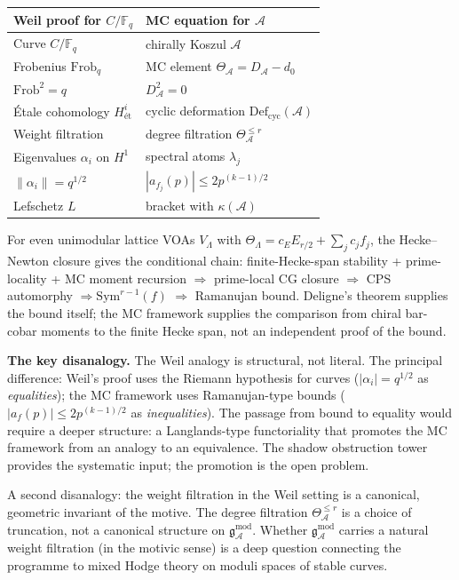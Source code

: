 \documentclass[11pt,reqno]{amsart}
\theoremstyle{definition}
\theoremstyle{remark}
\providecommand{\cA}{\mathcal{A}}
\providecommand{\Defcyc}{\mathrm{Def}_{\mathrm{cyc}}}
\providecommand{\Sym}{\mathrm{Sym}}
\providecommand{\gAmod}{\mathfrak{g}^{\mathrm{mod}}_\cA}
\providecommand{\Defcyc}{\mathrm{Def}_{\mathrm{cyc}}}
\providecommand{\bF}{\mathbb{F}}
\numberwithin{equation}{section}
\begin{document}
\begin{center}
\small
\renewcommand{\arraystretch}{1.1}
\begin{tabular}{ll}
\textbf{Weil proof for $C/\bF_q$} & \textbf{MC equation for $\cA$}\\ \hline
Curve $C/\bF_q$ & chirally Koszul $\cA$\\
Frobenius $\mathrm{Frob}_q$ & MC element $\Theta_\cA = D_\cA - d_0$\\
$\mathrm{Frob}^2 = q$ & $D_\cA^2 = 0$\\
\'Etale cohomology $H^i_{\text{\'et}}$ & cyclic deformation $\Defcyc(\cA)$\\
Weight filtration & degree filtration $\Theta_\cA^{\le r}$\\
Eigenvalues $\alpha_i$ on $H^1$ & spectral atoms $\lambda_j$\\
$\|\alpha_i\| = q^{1/2}$ & $|a_{f_j}(p)| \le 2p^{(k-1)/2}$\\
Lefschetz $L$ & bracket with $\kappa(\cA)$
\end{tabular}
\end{center}
For even unimodular lattice VOAs $V_\Lambda$ with
$\Theta_\Lambda = c_E E_{r/2} + \sum_j c_j f_j$, the
Hecke--Newton closure gives the conditional chain:
finite-Hecke-span stability + prime-locality + MC moment recursion
$\Rightarrow$ prime-local CG closure $\Rightarrow$ CPS automorphy
$\Rightarrow \Sym^{r-1}(f)$ $\Rightarrow$ Ramanujan bound.
Deligne's theorem supplies the bound itself; the MC framework
supplies the comparison from chiral bar-cobar moments to the finite
Hecke span, not an independent proof of the bound.

\medskip\noindent\textbf{The key disanalogy.}\enspace
The Weil analogy is structural, not literal. The
principal difference: Weil's proof uses the Riemann hypothesis
for curves ($|\alpha_i| = q^{1/2}$ as \emph{equalities}); the
MC framework uses Ramanujan-type bounds
($|a_f(p)| \le 2p^{(k-1)/2}$ as \emph{inequalities}). The
passage from bound to equality would require a deeper structure:
a Langlands-type functoriality that promotes the MC framework from
an analogy to an equivalence. The shadow obstruction tower
provides the systematic input; the promotion is the open problem.

A second disanalogy: the weight filtration in the Weil setting
is a canonical, geometric invariant of the motive. The degree
filtration $\Theta_\cA^{\le r}$ is a choice of truncation, not
a canonical structure on $\gAmod$. Whether $\gAmod$ carries a
natural weight filtration (in the motivic sense) is a deep
question connecting the programme to mixed Hodge theory on
moduli spaces of stable curves.
\end{document}
